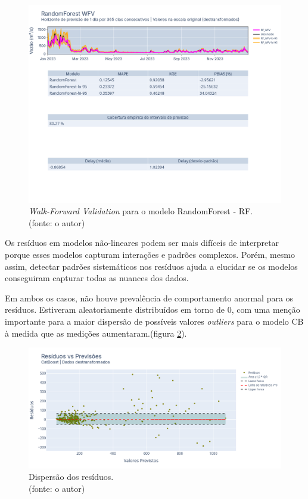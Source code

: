 \begin{figure}[!h]
\centering
\includegraphics[scale=0.33]{Figuras/jequiti/resultados/RF_WFV_LOG.png}
\caption{\textit{Walk-Forward Validation} para o modelo RandomForest - RF.\\(fonte: o autor)}
\label{fig:jequiti_RF_WFV_LOG}
\end{figure}
\clearpage

Os resíduos em modelos não-lineares podem ser mais difíceis de interpretar porque esses modelos capturam interações e padrões complexos. Porém, mesmo assim, detectar padrões sistemáticos nos resíduos ajuda a elucidar se os modelos conseguiram capturar todas as nuances dos dados.

Em ambos os casos, não houve prevalência de comportamento anormal para os resíduos. Estiveram aleatoriamente distribuídos em torno de $0$, com uma menção importante para a maior dispersão de possíveis valores \textit{outliers} para o modelo CB à medida que as medições aumentaram.(figura \ref{fig:jequiti_CB_WFV_LOG_RESID_x_PREV}).

\begin{figure}[!h]
\centering
\includegraphics[scale=0.33]{Figuras/jequiti/resultados/CB_WFV_LOG_RESID_x_PREV.png}
\caption{Dispersão dos resíduos.\\(fonte: o autor)}
\label{fig:jequiti_CB_WFV_LOG_RESID_x_PREV}
\end{figure}

